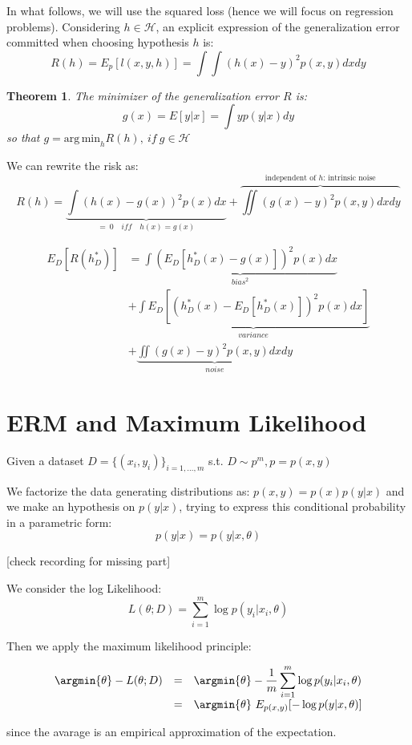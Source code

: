 In what follows, we will use the squared loss (hence we will focus on
regression problems). Considering $h \in \mathcal H$, an explicit expression of the generalization error committed when choosing hypothesis $h$ is:
$$
R(h) = E_p[l(x,y,h)] = \int \int (h(x) - y)^2 p(x,y) dx dy
$$

\newtheorem{theorem}{Theorem}
\begin{theorem}
    The minimizer of the generalization error $R$ is:
    $$
    \boxed{ g(x) = E[y|x] = \int y p(y|x) dy }
    $$
    so that $g = \mathrm{arg\,min}_h R(h),\ if\ g \in \mathcal H$
\end{theorem}

We can rewrite the risk as:
$$
R(h) = \underbrace{\int (h(x) - g(x))^2 p(x) dx}_{=\ 0 \quad iff \quad h(x) = g(x)} + \overbrace{\iint (g(x) - y)^2 p(x,y) dx dy}^{\text{independent of }h \text{: intrinsic noise}}
$$



$$
\begin{array}{rl}
E_D[R(h^*_D)]
& = \underbrace{\int ( E_D[h^*_D(x) - g(x)])^2 p(x) dx}_{bias^2} \\
& + \underbrace{\int E_D[(h^*_D(x) - E_D[h^*_D(x)])^2 p(x) dx]}_{variance} \\
& + \underbrace{\iint (g(x) - y)^2 p(x,y) dx dy}_{noise}
\end{array}
$$

\section{ERM and Maximum Likelihood}

Given a dataset $D = \{(x_i, y_i)\}_{i=1, \dots, m}$ s.t. $D \sim p^m, p = p(x,y)$

We factorize the data generating distributions as: $p(x,y) = p(x) p(y|x)$ and we make an hypothesis on $p(y|x)$, trying to express this conditional probability in a parametric form:
$$p(y|x) = p(y|x, \theta)$$

[check recording for missing part]

We consider the log Likelihood:
$$
L(\theta; D) = \sum_{i = 1}^m \log p(y_i | x_i, \theta)
$$

Then we apply the maximum likelihood principle:

$$
\begin{array}{rcl}
    \argmin{\theta} - L(\theta; D) &
    = & \argmin{\theta} - \dfrac 1m \displaystyle\sum_{i=1}^m \log p(y_i | x_i, \theta) \\
    & = & \argmin{\theta}\ E_{p(x,y)}[-\log p(y | x, \theta)]
\end{array}
$$

since the avarage is an empirical approximation of the expectation.